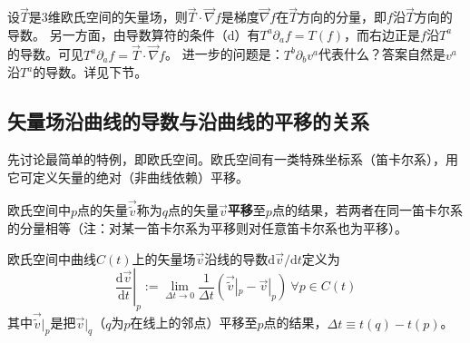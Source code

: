 设$\vec{T}$是$3$维欧氏空间的矢量场，则$\vec{T}\cdot\vec{\nabla}f$是梯度$\vec{\nabla}f$在$\vec{T}$方向的分量，即$f$沿$\vec{T}$方向的导数。
另一方面，由导数算符的条件（d）有$T^a\partial_af = T(f)$，而右边正是$f$沿$T^a$的导数。可见$T^a\partial_af = \vec{T}\cdot\vec{\nabla}f$。
进一步的问题是：$T^b\partial_bv^a$代表什么？答案自然是$v^a$沿$T^a$的导数。详见下节。

\subsection{矢量场沿曲线的导数与沿曲线的平移的关系}

先讨论最简单的特例，即欧氏空间。欧氏空间有一类特殊坐标系（笛卡尔系），用它可定义矢量的绝对（非曲线依赖）平移。

\begin{definition}
欧氏空间中$p$点的矢量$\vec{\tilde{v}}$称为$q$点的矢量$\vec{v}$\textbf{平移}至$p$点的结果，若两者在同一笛卡尔系的分量相等（注：对某一笛卡尔系为平移则对任意笛卡尔系也为平移）。
\end{definition}

\begin{definition}
欧氏空间中曲线$C(t)$上的矢量场$\vec{v}$沿线的导数$\mathrm{d}\vec{v} / \mathrm{d}t$定义为
$$\left.\frac{\mathrm{d}\vec{v}}{\mathrm{d}t}\right|_p := \lim_{\Delta t \to 0}\frac{1}{\Delta t}(\vec{\tilde v}|_p - \vec{v}|_p) ~ \forall p \in C(t)$$
其中$\vec{\tilde v}|_p$是把$\vec{v}|_q$（$q$为$p$在线上的邻点）平移至$p$点的结果，$\Delta t \equiv t(q) - t(p)$。
\end{definition}

